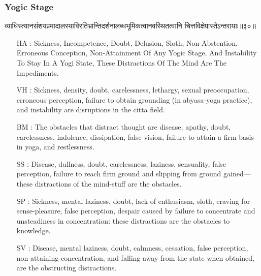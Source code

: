 \begin{frame}[fragile]\frametitle{Yogic Stage}
\begin{sanskrit}
व्याधिस्त्यानसंशयप्रमादालस्याविरतिभ्रान्तिदर्शनालब्धभूमिकत्वानवस्थितत्वानि चित्तविक्षेपास्तेऽन्तरायाः॥३०॥
\end{sanskrit}

	\begin{itemize}
	\item [HA]: Sickness, Incompetence, Doubt, Delusion, Sloth, Non-Abstention, Erroneous Conception, Non-Attainment Of Any Yogic Stage, And Instability To Stay In A Yogi State, These Distractions Of The Mind Are The Impediments.
	\item [VH]: Sickness, density, doubt, carelessness, lethargy, sexual preoccupation, erroneous perception, failure to obtain grounding (in abyasa-yoga practice), and instability are disruptions in the citta field.
	\item [BM]: The obstacles that distract thought are disease, apathy, doubt, carelessness, indolence, dissipation, false vision, failure to attain a firm basis in yoga, and restlessness.
	\item [SS]: Disease, dullness, doubt, carelessness, laziness, sensuality, false perception, failure to reach firm ground and slipping from ground gained—these distractions of the mind-stuff are the obstacles.
	\item [SP]: Sickness, mental laziness, doubt, lack of enthusiasm, sloth, craving for sense-pleasure, false perception, despair caused by failure to concentrate and unsteadiness in concentration: these distractions are the obstacles to knowledge.
	\item [SV]: Disease, mental laziness, doubt, calmness, cessation, false perception, non-attaining concentration, and falling away from the state when obtained, are the obstructing distractions.

 
	\end{itemize}
\end{frame}




